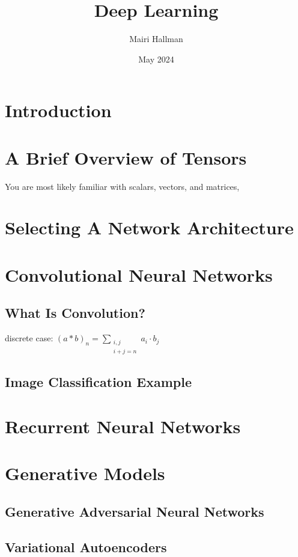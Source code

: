 \documentclass{article}
\title{Deep Learning}
\author{Mairi Hallman}
\date{May 2024}
\begin{document}
\maketitle

\section{Introduction}

\section{A Brief Overview of Tensors}

You are most likely familiar with scalars, vectors, and matrices,

\section{Selecting A Network Architecture}

\section{Convolutional Neural Networks}

\subsection{What Is Convolution?}

discrete case: \((a * b)_n = \sum\limits_{\substack{i,j \\ i+j=n}} a_i \cdot b_j\)

\subsection{Image Classification Example}

\section{Recurrent Neural Networks}

\section{Generative Models}

\subsection{Generative Adversarial Neural Networks}

\subsection{Variational Autoencoders}
\end{document}
